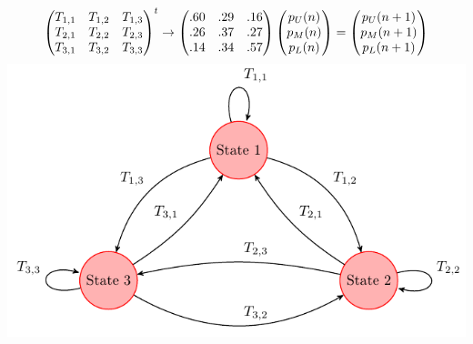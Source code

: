  \begin{center}
\begin{equation*}
  \begin{pmatrix}
    T_{1,1}  &T_{1,2}  &T_{1,3}  \\
    T_{2,1}  &T_{2,2}  &T_{2,3}  \\
    T_{3,1}  &T_{3,2}  &T_{3,3}
  \end{pmatrix}^t
\rightarrow
    \begin{pmatrix}
      .60  &.29  &.16  \\
      .26  &.37  &.27  \\
      .14  &.34  &.57
    \end{pmatrix}
    \begin{pmatrix} p_{U}(n) \\ p_{M}(n) \\ p_{L}(n) \end{pmatrix}
    =\begin{pmatrix} p_{U}(n+1) \\ p_{M}(n+1) \\ p_{L}(n+1) \end{pmatrix}
  \end{equation*}
    \includegraphics[width=0.7\linewidth]{../figures/transitiondiagram.pdf}
  \end{center}

